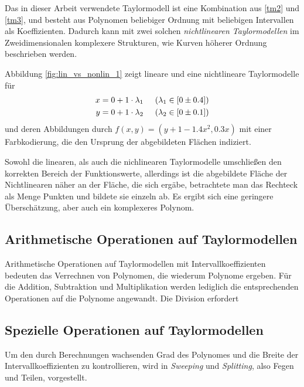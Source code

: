 Das in dieser Arbeit verwendete Taylormodell ist eine Kombination aus \ref{tm2} und \ref{tm3}, und besteht aus Polynomen beliebiger Ordnung mit beliebigen Intervallen als Koeffizienten. Dadurch kann mit zwei solchen \textit{nichtlinearen Taylormodellen} im Zweidimensionalen komplexere Strukturen, wie Kurven höherer Ordnung beschrieben werden.

Abbildung \ref{fig:lin_vs_nonlin_1} zeigt lineare und eine nichtlineare Taylormodelle für
\begin{align*}
x = 0 + 1 \cdot \lambda_1 & \hspace{0.5cm} (\lambda_1 \in [0 \pm 0.4]) \\
 y = 0 + 1 \cdot \lambda_2 & \hspace{0.5cm} (\lambda_2 \in [0 \pm 0.1])
\end{align*}
und deren Abbildungen durch $f(x,y) = (y + 1- 1.4 x^2,0.3x)$ mit einer Farbkodierung, die den Ursprung der abgebildeten Flächen indiziert.


Sowohl die linearen, als auch die nichlinearen Taylormodelle umschließen den korrekten Bereich der Funktionswerte, allerdings ist die abgebildete Fläche der Nichtlinearen näher an der Fläche, die sich ergäbe, betrachtete man das Rechteck als Menge Punkten und bildete sie einzeln ab. Es ergibt sich eine geringere Überschätzung, aber auch ein komplexeres Polynom.


\subsection{Arithmetische Operationen auf Taylormodellen}

Arithmetische Operationen auf Taylormodellen mit Intervallkoeffizienten bedeuten das Verrechnen von Polynomen, die wiederum Polynome ergeben. Für die Addition, Subtraktion und Multiplikation werden lediglich die entsprechenden Operationen auf die Polynome angewandt. Die Division erfordert



    \subsection{Spezielle Operationen auf Taylormodellen}
Um den durch Berechnungen wachsenden Grad des Polynomes und die Breite der Intervallkoeffizienten zu kontrollieren, wird in \cite{DBLP:conf/macis/BrausseKM15} \textit{Sweeping} und \textit{Splitting}, also Fegen und Teilen, vorgestellt. 

